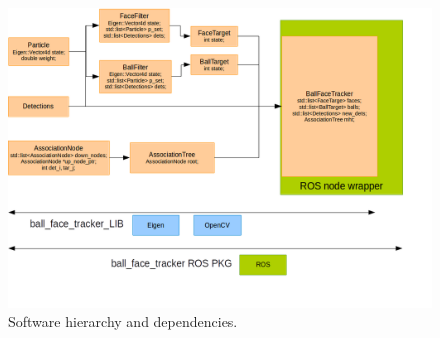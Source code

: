 \documentclass[a4paper]{article}
\begin{document}
  \begin{figure}[ht]
    \centering
    \includegraphics[scale=0.5]{RobocamSoftwareHierarchyDependencies}
    \caption{Software hierarchy and dependencies.}
    \label{fig:dependency1}
  \end{figure}
\end{document}
